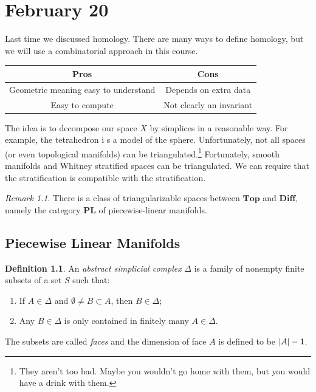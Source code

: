 \documentclass[leqno, openany]{memoir}
\theoremstyle{definition}
\newtheorem{defn}[thm]{Definition}
\theoremstyle{remark}
\newtheorem{rmk}[thm]{Remark}
\theoremstyle{plain}
\theoremstyle{definition}
\theoremstyle{remark}
\begin{document}
\chapter{February 20}%

Last time we discussed homology. There are many ways to define homology, but we
will use a combinatorial approach in this course.

\begin{center} \begin{tabular}{cc} \toprule Pros & Cons \\ \midrule Geometric
meaning easy to understand & Depends on extra data \\ Easy to compute & Not
clearly an invariant \\ \bottomrule \end{tabular} \end{center} The idea is to
decompose our space $X$ by simplices in a reasonable way. For example, the
tetrahedron i s a model of the sphere. Unfortunately, not all spaces (or even
topological manifolds) can be triangulated.\footnote{They aren't too bad. Maybe
you wouldn't go home with them, but you would have a drink with them.}
Fortunately, smooth manifolds and Whitney stratified spaces can be
triangulated. We can require that the stratification is compatible with the
stratification.

\begin{rmk} There is a class of triangularizable spaces between $\mathbf{Top}$
and $\mathbf{Diff}$, namely the category $\mathbf{PL}$ of piecewise-linear
manifolds.  \end{rmk}

\section{Piecewise Linear Manifolds}%

\begin{defn} An \textit{abstract simplicial complex} $\Delta$ is a family of
    nonempty finite subsets of a set $S$ such that: \begin{enumerate} \item If
        $A \in \Delta$ and $\emptyset \neq B \subset A$, then $B \in \Delta$;
    \item Any $B \in \Delta$ is only contained in finitely many $A \in \Delta$.
\end{enumerate} The subsets are called \textit{faces} and the dimension of face
$A$ is defined to be $\abs{A} - 1$.  \end{defn}
\end{document}
